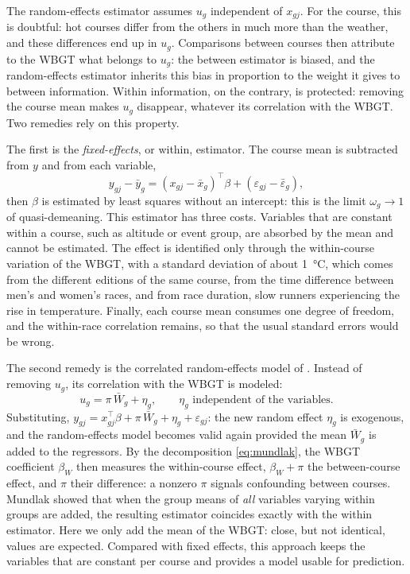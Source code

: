 \documentclass[11pt,a4paper]{article}
\begin{document}
The random-effects estimator assumes $u_g$ independent of $x_{gj}$. For the course, this is doubtful: hot courses
differ from the others in much more than the weather, and these differences end up in $u_g$. Comparisons between
courses then attribute to the WBGT what belongs to $u_g$: the between estimator is biased, and the random-effects
estimator inherits this bias in proportion to the weight it gives to between information. Within information, on the
contrary, is protected: removing the course mean makes $u_g$ disappear, whatever its correlation with the WBGT. Two
remedies rely on this property.

The first is the \emph{fixed-effects}, or within, estimator. The course mean is subtracted from $y$ and from each
variable,
\[
y_{gj} - \bar y_g = (x_{gj} - \bar x_g)^\top\beta + (\varepsilon_{gj} - \bar\varepsilon_g),
\]
then $\beta$ is estimated by least squares without an intercept: this is the limit $\omega_g \to 1$ of quasi-demeaning.
This estimator has three costs. Variables that are constant within a course, such as altitude or event group, are
absorbed by the mean and cannot be estimated. The effect is identified only through the within-course variation of the
WBGT, with a standard deviation of about 1~°C, which comes from the different editions of the same course, from the
time difference between men's and women's races, and from race duration, slow runners experiencing the rise in
temperature. Finally, each course mean consumes one degree of freedom, and the within-race correlation remains, so
that the usual standard errors would be wrong.

The second remedy is the correlated random-effects model of \citet{mundlak1978}. Instead of removing $u_g$, its
correlation with the WBGT is modeled:
\[
u_g = \pi\,\bar W_g + \eta_g, \qquad \eta_g \text{ independent of the variables.}
\]
Substituting, $y_{gj} = x_{gj}^\top\beta + \pi\,\bar W_g + \eta_g + \varepsilon_{gj}$: the new random effect $\eta_g$ is
exogenous, and the random-effects model becomes valid again provided the mean $\bar W_g$ is added to the regressors.
By the decomposition \eqref{eq:mundlak}, the WBGT coefficient $\beta_W$ then measures the within-course effect,
$\beta_W + \pi$ the between-course effect, and $\pi$ their difference: a nonzero $\pi$ signals confounding between
courses. Mundlak showed that when the group means of \emph{all} variables varying within groups are added, the
resulting estimator coincides exactly with the within estimator. Here we only add the mean of the WBGT: close, but not
identical, values are expected. Compared with fixed effects, this approach keeps the variables that are constant per
course and provides a model usable for prediction.
\end{document}
